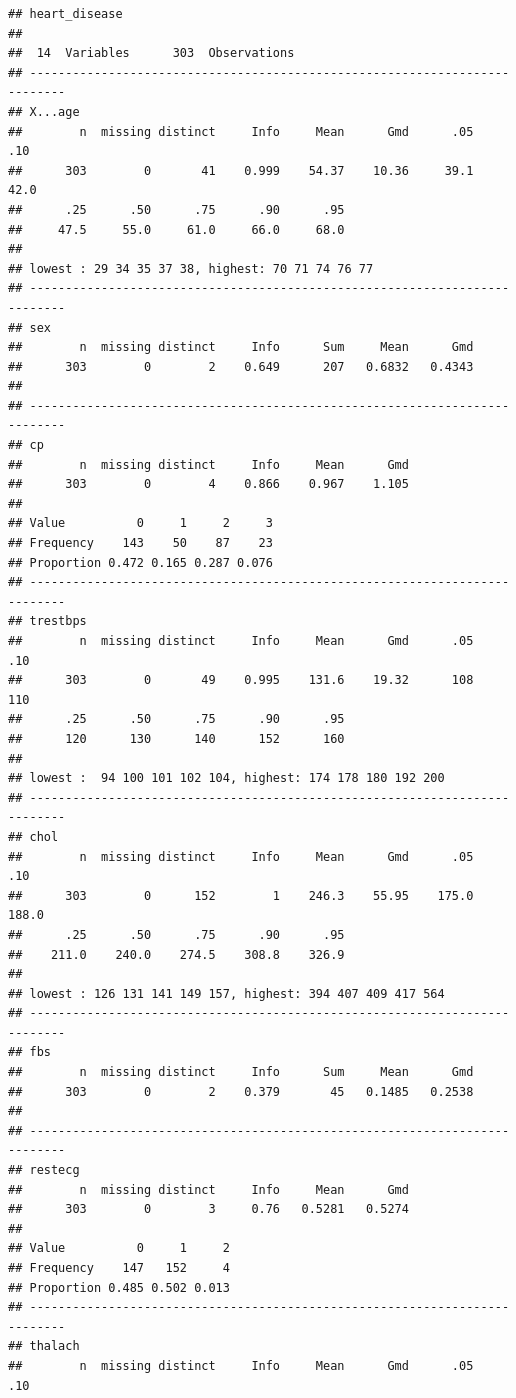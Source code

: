 \documentclass[]{article}
\begin{document}
\begin{verbatim}
## heart_disease 
## 
##  14  Variables      303  Observations
## ---------------------------------------------------------------------------
## X...age 
##        n  missing distinct     Info     Mean      Gmd      .05      .10 
##      303        0       41    0.999    54.37    10.36     39.1     42.0 
##      .25      .50      .75      .90      .95 
##     47.5     55.0     61.0     66.0     68.0 
## 
## lowest : 29 34 35 37 38, highest: 70 71 74 76 77
## ---------------------------------------------------------------------------
## sex 
##        n  missing distinct     Info      Sum     Mean      Gmd 
##      303        0        2    0.649      207   0.6832   0.4343 
## 
## ---------------------------------------------------------------------------
## cp 
##        n  missing distinct     Info     Mean      Gmd 
##      303        0        4    0.866    0.967    1.105 
##                                   
## Value          0     1     2     3
## Frequency    143    50    87    23
## Proportion 0.472 0.165 0.287 0.076
## ---------------------------------------------------------------------------
## trestbps 
##        n  missing distinct     Info     Mean      Gmd      .05      .10 
##      303        0       49    0.995    131.6    19.32      108      110 
##      .25      .50      .75      .90      .95 
##      120      130      140      152      160 
## 
## lowest :  94 100 101 102 104, highest: 174 178 180 192 200
## ---------------------------------------------------------------------------
## chol 
##        n  missing distinct     Info     Mean      Gmd      .05      .10 
##      303        0      152        1    246.3    55.95    175.0    188.0 
##      .25      .50      .75      .90      .95 
##    211.0    240.0    274.5    308.8    326.9 
## 
## lowest : 126 131 141 149 157, highest: 394 407 409 417 564
## ---------------------------------------------------------------------------
## fbs 
##        n  missing distinct     Info      Sum     Mean      Gmd 
##      303        0        2    0.379       45   0.1485   0.2538 
## 
## ---------------------------------------------------------------------------
## restecg 
##        n  missing distinct     Info     Mean      Gmd 
##      303        0        3     0.76   0.5281   0.5274 
##                             
## Value          0     1     2
## Frequency    147   152     4
## Proportion 0.485 0.502 0.013
## ---------------------------------------------------------------------------
## thalach 
##        n  missing distinct     Info     Mean      Gmd      .05      .10 

\end{verbatim}
\end{document}
